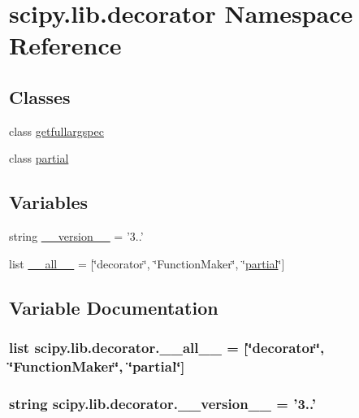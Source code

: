 \hypertarget{namespacescipy_1_1lib_1_1decorator}{}\section{scipy.\+lib.\+decorator Namespace Reference}
\label{namespacescipy_1_1lib_1_1decorator}
\subsection*{Classes}
\begin{DoxyCompactItemize}
\item 
class \hyperlink{classscipy_1_1lib_1_1decorator_1_1getfullargspec}{getfullargspec}
\item 
class \hyperlink{classscipy_1_1lib_1_1decorator_1_1partial}{partial}
\end{DoxyCompactItemize}
\subsection*{Variables}
\begin{DoxyCompactItemize}
\item 
string \hyperlink{namespacescipy_1_1lib_1_1decorator_a9fec469449bca4d242cd80a27aec55c4}{\+\_\+\+\_\+version\+\_\+\+\_\+} = '3..'
\item 
list \hyperlink{namespacescipy_1_1lib_1_1decorator_a3056d98b4b549f58114118248ae59305}{\+\_\+\+\_\+all\+\_\+\+\_\+} = \mbox{[}\char`\"{}decorator\char`\"{}, \char`\"{}Function\+Maker\char`\"{}, \char`\"{}\hyperlink{classscipy_1_1lib_1_1decorator_1_1partial}{partial}\char`\"{}\mbox{]}
\end{DoxyCompactItemize}


\subsection{Variable Documentation}
\hypertarget{namespacescipy_1_1lib_1_1decorator_a3056d98b4b549f58114118248ae59305}{}
\subsubsection[{\+\_\+\+\_\+all\+\_\+\+\_\+}]{\setlength{\rightskip}{0pt plus 5cm}list scipy.\+lib.\+decorator.\+\_\+\+\_\+all\+\_\+\+\_\+ = \mbox{[}\char`\"{}decorator\char`\"{}, \char`\"{}Function\+Maker\char`\"{}, \char`\"{}{\bf partial}\char`\"{}\mbox{]}}\label{namespacescipy_1_1lib_1_1decorator_a3056d98b4b549f58114118248ae59305}
\hypertarget{namespacescipy_1_1lib_1_1decorator_a9fec469449bca4d242cd80a27aec55c4}{}
\subsubsection[{\+\_\+\+\_\+version\+\_\+\+\_\+}]{\setlength{\rightskip}{0pt plus 5cm}string scipy.\+lib.\+decorator.\+\_\+\+\_\+version\+\_\+\+\_\+ = '3..'}\label{namespacescipy_1_1lib_1_1decorator_a9fec469449bca4d242cd80a27aec55c4}
